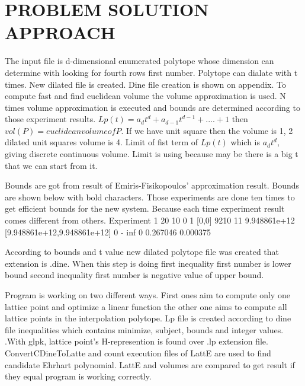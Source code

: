\documentclass[12pt,twoside]{article}
\begin{document}
\newpage
\section{PROBLEM SOLUTION APPROACH}
\par
The input file is d-dimensional enumerated polytope whose dimension can
determine with looking for fourth rows first number. Polytope can dialate with t
times. New dilated file is created. Dine file creation is shown on appendix. To
compute fast and find euclidean volume the volume approximation is used. N times
volume approximation is executed and bounds are determined according to those
experiment results. $Lp(t) = a_dt^d + a_{d-1}t^{d-1} + .... + 1$ then $vol(P) = euclidean volume of P$. If we have unit square then the volume is 1, 2 dilated unit squares volume is 4. Limit of fist term of $Lp(t)$ which is $a_dt^d$, giving discrete continuous volume. Limit is using because may be there is a big t that we can start from it.\newline 
\par

Bounds are got from result of Emiris-Fisikopoulos' approximation result.
Bounds are shown below with bold characters. Those experiments are done ten
times to get efficient bounds for the new system. Because each time experiment
result comes different from others.\newline \newline
Experiment 1  20 10 0 1 [0,0] 9210 11 9.948861e+12 [9.948861e+12,9.948861e+12] 0 -
inf 0 0.267046 0.000375 \newline
\par
According to bounds and t value new dilated polytope file was created that extension is .dine. 
When this step is doing first inequality first number is lower bound
second inequality first number is negative value of upper bound.
\par
Program is working on two different ways. First ones aim to compute only one
lattice point and optimize a linear function the other one aims to compute all lattice points in the interpolation polytope. Lp file is created according to dine file inequalities which contains minimize, subject, bounds and integer values. .With glpk, lattice point's H-represention is found over .lp extension file. ConvertCDineToLatte and
count execution files of LattE are used to find candidate Ehrhart polynomial. LattE
and volumes are compared to get result if they equal program is working correctly.
\newpage
\end{document}
